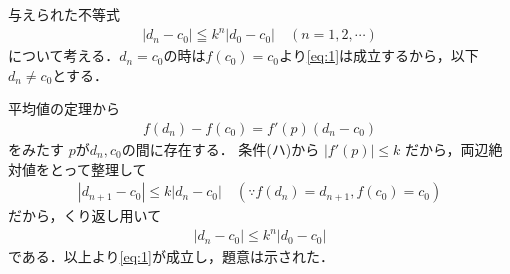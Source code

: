 \documentclass[../../main.tex]{subfiles}
\begin{document}
与えられた不等式
\begin{align}
  |d_n-c_0| \leqq k^n|d_0-c_0| \quad (n=1,2,\cdots)  \label{eq:1}
\end{align}
について考える．$d_n = c_0$の時は$f(c_0)=c_0$より\cref{eq:1}は成立するから，以下$d_n \neq c_0$とする．

平均値の定理から
\begin{align}
  f(d_n) - f(c_0) = f'(p) (d_n - c_0)
\end{align}
をみたす $p$が$d_n, c_0$の間に存在する．
条件(ハ)から $|f'(p)| \le k$ だから，両辺絶対値をとって整理して
\begin{align}
  |d_{n+1} - c_0| \le k |d_n - c_0| \quad (\because f(d_n) = d_{n+1}, f(c_0) = c_0)
\end{align}
だから，くり返し用いて
\begin{align}
  |d_n - c_0| \le k^n |d_0 - c_0|
\end{align}
である．以上より\cref{eq:1}が成立し，題意は示された．
\end{document}
